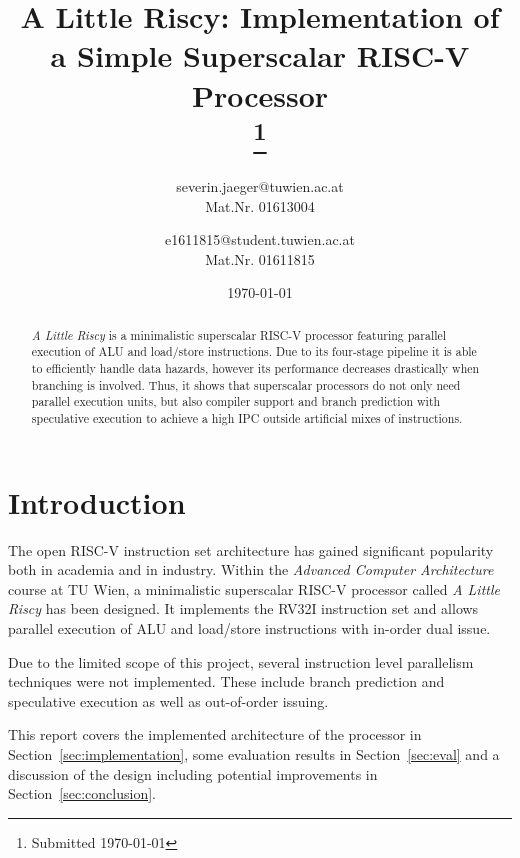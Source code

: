 \documentclass[conference]{IEEEtran}
\begin{document}
\title{A Little Riscy: Implementation of a Simple Superscalar RISC-V Processor\\
{
\thanks{Submitted \today}
}
}

\date{\today}

\author{
severin.jaeger@tuwien.ac.at\\
Mat.Nr. 01613004\\

\and
{}
e1611815@student.tuwien.ac.at\\
Mat.Nr. 01611815\\
}

\maketitle

\begin{abstract}
\emph{A Little Riscy} is a minimalistic superscalar RISC-V processor featuring parallel execution of ALU and load/store instructions. Due to its four-stage pipeline it is able to efficiently handle data hazards, however its performance decreases drastically when branching is involved. Thus, it shows that superscalar processors do not only need parallel execution units, but also compiler support and branch prediction with speculative execution to achieve a high IPC outside artificial mixes of instructions.
\end{abstract}

\section{Introduction}
The open RISC-V instruction set architecture \cite{risc-v} has gained significant popularity both in academia and in industry. Within the \emph{Advanced Computer Architecture} course at TU Wien, a minimalistic superscalar RISC-V processor called \emph{A Little Riscy} has been designed. It implements the RV32I instruction set and allows parallel execution of ALU and load/store instructions with in-order dual issue.

Due to the limited scope of this project, several instruction level parallelism techniques were not implemented. These include branch prediction and speculative execution as well as out-of-order issuing.

This report covers the implemented architecture of the processor in Section~\ref{sec:implementation}, some evaluation results in Section~\ref{sec:eval} and a discussion of the design including potential improvements in Section~\ref{sec:conclusion}.
\end{document}
